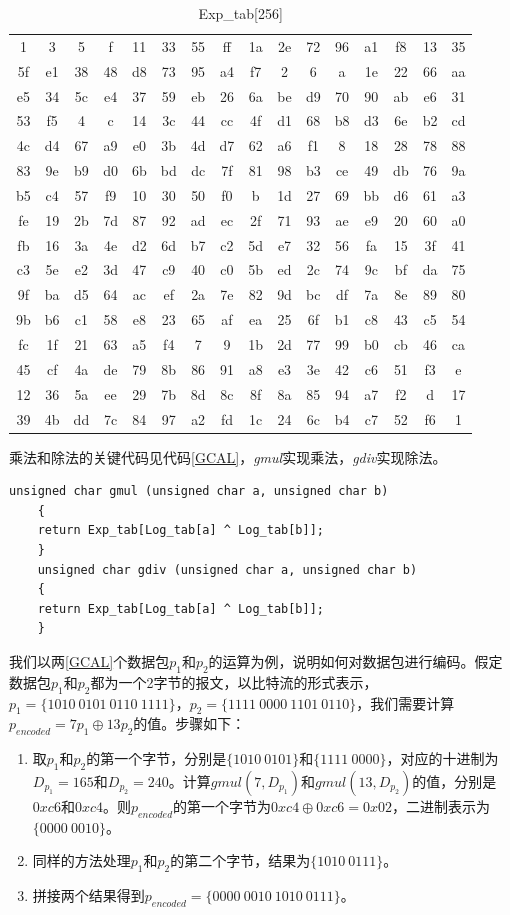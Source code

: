 \begin{table}[htb]
	\caption{Exp\_tab[256]}
	\centering
	\begin{tabular}{cccccccccccccccc}
		\toprule
 1& 3& 5& f&11&33&55&ff&1a&2e&72&96&a1&f8&13&35\\
5f&e1&38&48&d8&73&95&a4&f7& 2& 6& a&1e&22&66&aa\\
e5&34&5c&e4&37&59&eb&26&6a&be&d9&70&90&ab&e6&31\\
53&f5& 4& c&14&3c&44&cc&4f&d1&68&b8&d3&6e&b2&cd\\
4c&d4&67&a9&e0&3b&4d&d7&62&a6&f1& 8&18&28&78&88\\
83&9e&b9&d0&6b&bd&dc&7f&81&98&b3&ce&49&db&76&9a\\
b5&c4&57&f9&10&30&50&f0& b&1d&27&69&bb&d6&61&a3\\
fe&19&2b&7d&87&92&ad&ec&2f&71&93&ae&e9&20&60&a0\\
fb&16&3a&4e&d2&6d&b7&c2&5d&e7&32&56&fa&15&3f&41\\
c3&5e&e2&3d&47&c9&40&c0&5b&ed&2c&74&9c&bf&da&75\\
9f&ba&d5&64&ac&ef&2a&7e&82&9d&bc&df&7a&8e&89&80\\
9b&b6&c1&58&e8&23&65&af&ea&25&6f&b1&c8&43&c5&54\\
fc&1f&21&63&a5&f4& 7& 9&1b&2d&77&99&b0&cb&46&ca\\
45&cf&4a&de&79&8b&86&91&a8&e3&3e&42&c6&51&f3& e\\
12&36&5a&ee&29&7b&8d&8c&8f&8a&85&94&a7&f2& d&17\\
39&4b&dd&7c&84&97&a2&fd&1c&24&6c&b4&c7&52&f6& 1\\
		\bottomrule
	\end{tabular}
	\label{Exptab}
\end{table}
乘法和除法的关键代码见代码\ref{GCAL}，\emph{gmul}实现乘法，\emph{gdiv}实现除法。
	\begin{lstlisting}[caption=gmul和gdiv实现,label={GCAL},language={[ANSI]C}]
	unsigned char gmul (unsigned char a, unsigned char b)
	{
	return Exp_tab[Log_tab[a] ^ Log_tab[b]];
	}
	unsigned char gdiv (unsigned char a, unsigned char b)
	{
	return Exp_tab[Log_tab[a] ^ Log_tab[b]];
	}
	\end{lstlisting}

\par
我们以两\ref{GCAL}个数据包$p_{1}$和$p_{2}$的运算为例，说明如何对数据包进行编码。假定数据包$p_{1}$和$p_{2}$都为一个2字节的报文，以比特流的形式表示，$p_{1}=\{1010\ 0101\ 0110\ 1111\}$，$p_{2}=\{1111\ 0000\ 1101\ 0110\}$，我们需要计算$p_{encoded}=7p_{1} \oplus 13p_{2}$的值。步骤如下：
\begin{enumerate}[fullwidth,itemindent=2em,label=(\arabic*)]
	\item 取$p_{1}$和$p_{2}$的第一个字节，分别是$\{1010\ 0101\}$和$\{1111\ 0000\}$，对应的十进制为$D_{p_1}=165$和$D_{p_2}=240$。计算$gmul\left(7,D_{p_1}\right)$和$gmul\left(13,D_{p_2}\right)$的值，分别是$0xc6$和$0xc4$。则$p_{encoded}$的第一个字节为$0xc4 \oplus 0xc6=0x02$，二进制表示为$\{0000\ 0010\}$。
	\item 同样的方法处理$p_{1}$和$p_{2}$的第二个字节，结果为$\{1010\ 0111\}$。
	\item 拼接两个结果得到$p_{encoded}=\{0000\ 0010\ 1010\ 0111\}$。
\end{enumerate}

